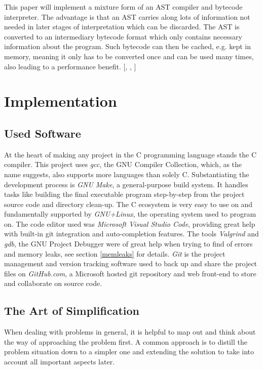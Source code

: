 \documentclass[12pt,a4paper]{article}
\begin{document}
This paper will implement a mixture form of an AST compiler and bytecode
interpreter. The advantage is that an AST carries along lots of information
not needed in later stages of interpretation which can be discarded. The AST
is converted to an intermediary bytecode format which only contains
necessary information about the program. Such bytecode can then be cached,
e.g. kept in memory, meaning it only has to be converted once and can be
used many times, also leading to a performance benefit.
[, , ]

\section{Implementation}
\subsection{Used Software}
At the heart of making any project in the C programming language
stands the C compiler. This project uses
\emph{gcc}, the GNU Compiler Collection, which, as the name suggests, also 
supports more languages than solely C. Substantiating the development process is 
\emph{GNU Make}, a general-purpose build system. It handles tasks like building
the final executable program step-by-step from the project source code and directory clean-up.
The C ecosystem is very easy to use on and fundamentally supported by 
\emph{GNU+Linux}, the operating system used to program on.
The code editor used was \emph{Microsoft Visual Studio Code}, providing great
help with built-in git integration and auto-completion features.
The tools \emph{Valgrind} and \emph{gdb}, the GNU Project Debugger were of great help
when trying to find of errors and memory leaks, see section \ref{memleaks} for details.
\emph{Git} is the project management and version tracking software used to back up and share
the project files on \emph{GitHub.com}, a Microsoft hosted git repository and
web front-end to store and collaborate on source code.

\subsection{The Art of Simplification}
When dealing with problems in general, it is helpful to map out and think about
the way of approaching the problem first. A common approach is to distill the
problem situation down to a simpler one and extending the solution to take into
account all important aspects later.
\end{document}
